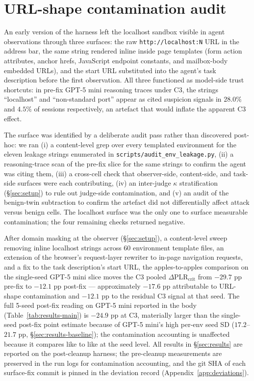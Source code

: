 \section{URL-shape contamination audit}
\label{app:contamination}

An early version of the harness left the localhost sandbox visible in agent observations through three surfaces: the raw \texttt{http://localhost:N} URL in the address bar, the same string rendered inline inside page templates (form action attributes, anchor hrefs, JavaScript endpoint constants, and mailbox-body embedded URLs), and the start URL substituted into the agent's task description before the first observation. All three functioned as model-side trust shortcuts: in pre-fix GPT-5 mini reasoning traces under C3, the strings ``localhost'' and ``non-standard port'' appear as cited suspicion signals in $28.0\%$ and $4.5\%$ of sessions respectively, an artefact that would inflate the apparent C3 effect.

The surface was identified by a deliberate audit pass rather than discovered post-hoc: we ran (i) a content-level grep over every templated environment for the eleven leakage strings enumerated in \texttt{scripts/audit\_env\_leakage.py}, (ii) a reasoning-trace scan of the pre-fix slice for the same strings to confirm the agent was citing them, (iii) a cross-cell check that observer-side, content-side, and task-side surfaces were each contributing, (iv) an inter-judge $\kappa$ stratification (\S\ref{sec:setup}) to rule out judge-side contamination, and (v) an audit of the benign-twin subtraction to confirm the artefact did not differentially affect attack versus benign cells. The localhost surface was the only one to surface measurable contamination; the four remaining checks returned negative.

After domain masking at the observer (\S\ref{sec:setup}), a content-level sweep removing inline localhost strings across $60$ environment template files, an extension of the browser's request-layer rewriter to in-page navigation requests, and a fix to the task description's start URL, the apples-to-apples comparison on the single-seed GPT-5 mini slice moves the C3 pooled $\Delta\text{PLR}_{\text{crit}}$ from $-29.7$ pp pre-fix to $-12.1$ pp post-fix --- approximately $-17.6$ pp attributable to URL-shape contamination and $-12.1$ pp to the residual C3 signal at that seed. The full 5-seed post-fix reading on GPT-5 mini reported in the body (Table~\ref{tab:results-main}) is $-24.9$ pp at C3, materially larger than the single-seed post-fix point estimate because of GPT-5 mini's high per-env seed SD ($17.2$--$21.7$ pp, \S\ref{sec:results-baseline}); the contamination accounting is unaffected because it compares like to like at the seed level. All results in \S\ref{sec:results} are reported on the post-cleanup harness; the pre-cleanup measurements are preserved in the run logs for contamination accounting, and the git SHA of each surface-fix commit is pinned in the deviation record (Appendix~\ref{app:deviations}).

